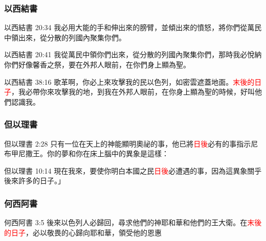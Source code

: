 \subsubsection{以西結書}
以西結書 20:34
我必用大能的手和伸出來的膀臂，並傾出來的憤怒，將你們從萬民中領出來，從分散的列國內聚集你們。

以西結書 20:41
我從萬民中領你們出來，從分散的列國內聚集你們，那時我必悅納你們好像馨香之祭，要在外邦人眼前，在你們身上顯為聖。

以西結書 38:16
歌革啊，你必上來攻擊我的民以色列，如密雲遮蓋地面。\textcolor{red}{末後的日子}，我必帶你來攻擊我的地，到我在外邦人眼前，在你身上顯為聖的時候，好叫他們認識我。

      
\subsubsection{但以理書}
但以理書 2:28
只有一位在天上的神能顯明奧祕的事，他已將\textcolor{red}{日後}必有的事指示尼布甲尼撒王。你的夢和你在床上腦中的異象是這樣：

但以理書 10:14
現在我來，要使你明白本國之民\textcolor{red}{日後}必遭遇的事，因為這異象關乎後來許多的日子。」

\subsubsection{何西阿書}
何西阿書 3:5
後來以色列人必歸回，尋求他們的神耶和華和他們的王大衛。在\textcolor{red}{末後的日子}，必以敬畏的心歸向耶和華，領受他的恩惠


